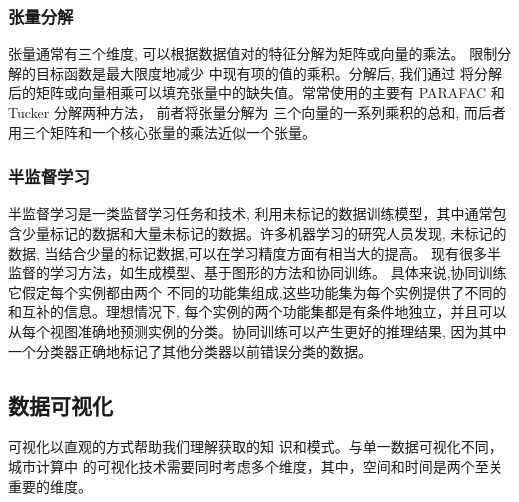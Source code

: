 \subsubsection*{张量分解}
张量通常有三个维度, 可以根据数据值对的特征分解为矩阵或向量的乘法。 限制分解的目标函数是最大限度地减少
中现有项的值的乘积。分解后, 我们通过
将分解后的矩阵或向量相乘可以填充张量中的缺失值。常常使用的主要有 PARAFAC\cite{bro1997parafac} 和 Tucker 分解\cite{kolda2009tensor}两种方法， 前者将张量分解为
三个向量的一系列乘积的总和, 而后者
用三个矩阵和一个核心张量的乘法近似一个张量。
\subsubsection*{半监督学习
}
半监督学习是一类监督学习任务和技术, 利用未标记的数据训练模型，其中通常包含少量标记的数据和大量未标记的数据。许多机器学习的研究人员发现, 未标记的数据, 当结合少量的标记数据,可以在学习精度方面有相当大的提高。 现有很多半监督的学习方法，如生成模型、基于图形的方法和协同训练。 具体来说,协同训练它假定每个实例都由两个
不同的功能集组成,这些功能集为每个实例提供了不同的和互补的信息。理想情况下, 每个实例的两个功能集都是有条件地独立，并且可以从每个视图准确地预测实例的分类。协同训练可以产生更好的推理结果, 因为其中一个分类器正确地标记了其他分类器以前错误分类的数据\cite{nigam2000analyzing}。\\

\subsection{数据可视化}
可视化以直观的方式帮助我们理解获取的知
识和模式。与单一数据可视化不同，城市计算中
的可视化技术需要同时考虑多个维度，其中，空间和时间是两个至关重要的维度\cite{zhengyu2015}。